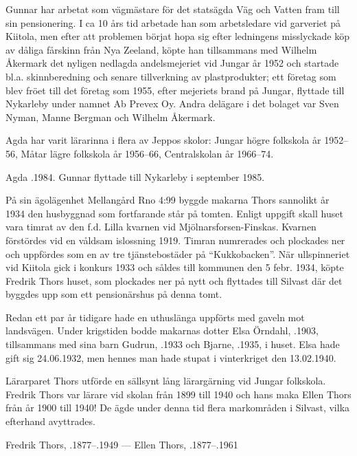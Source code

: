 Gunnar har arbetat som vägmästare för det statsägda Väg och Vatten fram till sin pensionering. I ca 10 års tid arbetade han som arbetsledare vid garveriet på Kiitola, men efter att problemen börjat hopa sig efter ledningens misslyckade köp av dåliga fårskinn från Nya Zeeland, köpte han tillsammans med Wilhelm Åkermark det nyligen nedlagda andelsmejeriet vid Jungar år 1952 och startade bl.a. skinnberedning och senare tillverkning av plastprodukter; ett företag som blev fröet till det företag som 1955, efter mejeriets brand på Jungar, flyttade till Nykarleby	under namnet  Ab Prevex Oy. Andra delägare i det bolaget var Sven	Nyman, Manne Bergman och Wilhelm Åkermark.

Agda har varit lärarinna i flera av Jeppos skolor: Jungar högre folkskola år 1952--56, Måtar lägre folkskola år 1956--66, Centralskolan år 1966--74.

Agda .1984. Gunnar flyttade till Nykarleby i september 1985.


%
På sin ägolägenhet Mellangård Rno 4:99 byggde makarna Thors sannolikt år 1934 den husbyggnad som fortfarande står på tomten. Enligt uppgift skall huset vara timrat av den f.d. Lilla kvarnen vid	Mjölnarsforsen-Finskas. Kvarnen förstördes vid en våldsam islossning 1919. Timran numrerades och plockades ner och uppfördes som	en av tre tjänstebostäder på ``Kukkobacken''. När ullspinneriet vid	Kiitola gick i konkurs 1933 och såldes till kommunen den 5 febr. 1934, köpte Fredrik Thors huset, som plockades ner på nytt och flyttades till Silvast där det byggdes upp som ett pensionärshus på denna tomt.

Redan ett par år tidigare hade en uthuslänga uppförts med gaveln	mot landsvägen. Under krigstiden bodde makarnas dotter Elsa Örndahl, .1903, tillsammans med sina barn Gudrun, .1933 och Bjarne, .1935, i huset. Elsa hade gift sig 24.06.1932, men hennes man hade stupat i vinterkriget den 13.02.1940.

Lärarparet Thors utförde en sällsynt lång lärargärning vid Jungar	folkskola. Fredrik Thors var lärare vid skolan från 1899 till 1940 och hans maka Ellen Thors från år 1900 till 1940! De ägde under denna tid flera markområden i Silvast, vilka efterhand avyttrades.

Fredrik Thors, .1877--.1949  ---  Ellen Thors, .1877--.1961



